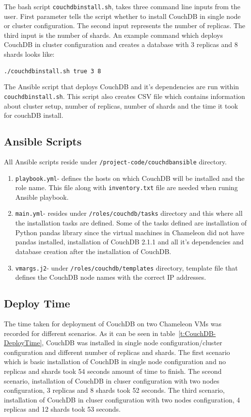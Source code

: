 The bash script \verb|couchdbinstall.sh|, takes three command line inputs
from the user. First parameter tells the script whether to install
CouchDB in single node or cluster configuration. The second input
represents the
number of replicas. The third input is the number of shards. An
example command which deploys CouchDB in cluster configuration and creates a database with 3
replicas and 8 shards looks like:

\verb|./couchdbinstall.sh true 3 8|


The Ansible script that deploys CouchDB and it's dependencies are run
within \verb|couchdbinstall.sh|. This script also creates CSV file which
contains information about cluster setup, number of replicas, number
of shards and the time it took for couchDB install.

\subsection{Ansible Scripts}
All Ansible scripts reside under \verb|/project-code/couchdbansible|
directory. 
\begin{enumerate}
  \item \verb|playbook.yml|- defines the hosts on which CouchDB will be
    installed and the role name. This file along with \verb|inventory.txt|
    file are needed when runing Ansible playbook.

  \item \verb|main.yml|- resides under \verb|/roles/couchdb/tasks|
    directory and this where all the installation tasks are
    defined. Some of the tasks defined are installation of Python
    pandas library since the virtual machines in Chameleon did not have pandas
    installed, installation of CouchDB 2.1.1 and all it's dependencies
    and database creation after the installation of CouchDB.

  \item \verb|vmargs.j2|- under \verb|/roles/couchdb/templates| directory, template
    file that defines the CouchDB node names with the correct IP addresses.
\end{enumerate}

\subsection{Deploy Time}
The time taken for deployment of CouchDB on two Chameleon VMs was recorded for different
scenarios. As it can be seen in table~\ref{t:CouchDB-DeployTime},
CouchDB was installed in single node configuration/cluster configuration and different
number of replicas and shards. The first scenario which is basic installation of CouchDB
in single node configuration and no replicas and shards took 54 seconds
amount of time to finish. The sceond scenario, installation of CouchDB
in cluser configuration with two nodes configuration, 3 replicas and
8 shards took 52 seconds. The third scenario, installation of CouchDB
in cluser configuration with two nodes configuration, 4 replicas and
12 shards took 53 seconds. 


